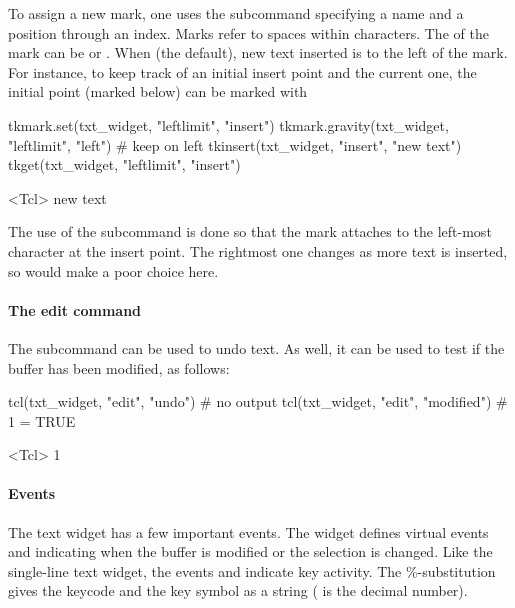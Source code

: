To assign a new mark, one uses the 
subcommand specifying a name and a position through an index. Marks
refer to spaces within characters. The  of the mark can
be  or . When  (the default), new
text inserted is to the left of the mark. For instance, to keep track
of an initial insert point and the current one, the initial point
(marked  below) can be marked with
\begin{Schunk}
\begin{Sinput}
 tkmark.set(txt_widget, "leftlimit", "insert")
 tkmark.gravity(txt_widget, "leftlimit", "left")    # keep on left
 tkinsert(txt_widget, "insert", "new text")
 tkget(txt_widget, "leftlimit", "insert")
\end{Sinput}
\begin{Soutput}
<Tcl> new text 
\end{Soutput}
\end{Schunk}
%
The use of the subcommand  is done so
that the mark attaches to the left-most character at the insert
point. The rightmost one changes as more text is inserted, so would
make a poor choice here.


\paragraph{The edit command}
The subcommand  can be used to undo text. As
well, it can be used to test if the buffer has been modified, as
follows:
\begin{Schunk}
\begin{Sinput}
 tcl(txt_widget, "edit", "undo")                  # no output
 tcl(txt_widget, "edit", "modified")              # 1 = TRUE
\end{Sinput}
\begin{Soutput}
<Tcl> 1 
\end{Soutput}
\end{Schunk}



\paragraph{Events}
The text widget has a few important events.  The widget defines
virtual events  and
 indicating when the buffer is modified
or the selection is changed. Like the single-line text widget, the
events  and  indicate
key activity. The \%-substitution  gives the keycode and
 the key symbol as a string ( is the decimal number).



